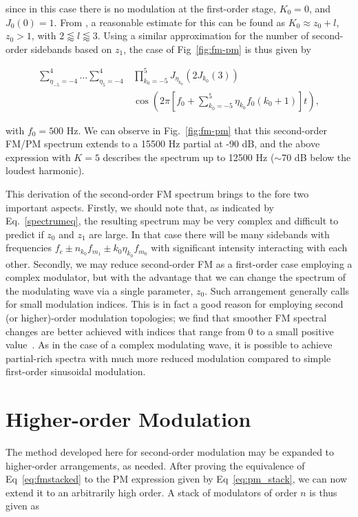 \documentclass[]{interact}
\begin{document}
\noindent since in this case there is no modulation at the first-order stage, $K_0=0$, and $J_0(0) = 1$. 
From \cite{Lazzarini2021}, a reasonable estimate for this can be found as $K_0 \approx z_0 + l$, $z_0 > 1$, with $2 \lessapprox  l \lessapprox  3$. Using a similar approximation for the number of second-order sidebands based on $z_1$, the case of Fig~\ref{fig:fm-pm} is thus given by

\begin{equation}\label{spectrumeq}
\begin{split}
\sum_{\eta_{-5}=-4}^{4} \ldots \sum_{\eta_{5}=-4}^{4} &\prod_{k_0=-5}^{5} J_{\eta_{k_0}}\left(2 J_{k_0}(3)\right)\\
&\cos\left(2 \pi [f_0  + \sum_{k_0=-5}^{5} \eta_{k_0} f_0(k_0+1)] t \right),
\end{split}
\end{equation}

\noindent with $f_0 = 500$ Hz. We can observe in Fig.~\ref{fig:fm-pm} that this second-order FM/PM spectrum 
extends to a 15500 Hz partial at -90 dB, and the above expression with $K=5$ describes the spectrum up to 
12500 Hz ($\sim$70 dB below the loudest harmonic).

This derivation of the second-order FM spectrum brings to the fore two important aspects.
Firstly, we should note that, as indicated by Eq.~\ref{spectrumeq}, the resulting spectrum may be very
complex and difficult to predict if $z_0$ and $z_1$ are large. In that case there will be many
sidebands with frequencies $f_c \pm n_{k_0} f_{m_1} \pm k_0 \eta_{k_0} f_{m_0}$ with significant intensity interacting with each other. Secondly, we may reduce second-order FM as a first-order case employing a complex modulator, but
with the advantage that we can change the spectrum of the modulating wave via a single
parameter, $z_0$. Such arrangement generally calls for small modulation indices. This is 
in fact a good reason for employing second (or higher)-order modulation topologies;
we find that smoother FM spectral changes are better achieved with indices that range from 
0 to a small positive value~\citep{Lazzarini2021}. As in the case of a complex modulating wave,
it is possible to achieve partial-rich spectra with much more reduced modulation compared
to simple first-order sinusoidal modulation. 

\section{Higher-order Modulation}
The method developed here for second-order modulation may be expanded to higher-order arrangements,
as needed. After proving the equivalence of Eq~\ref{eq:fmstacked} to the PM expression given by
Eq~\ref{eq:pm_stack}, we can now extend it to an arbitrarily high order. A stack of modulators of
order $n$ is thus given as
\end{document}
